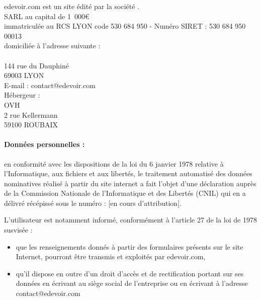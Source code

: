 edevoir.com est un site édité par la société \eDevoir.\\

SARL \eDevoir au capital de 1~000\euro\\
immatriculée au RCS LYON code 530 684 950 - Numéro SIRET : 530 684 950 00013\\

domiciliée à l'adresse suivante :\\
\eDevoir\\
144 rue du Dauphiné\\
69003 LYON\\
E-mail : contact@edevoir.com\\

Hébergeur :\\
OVH\\
2 rue Kellermann\\
59100 ROUBAIX

\paragraph*{Données personnelles :}
en conformité avec les dispositions de la loi du 6 janvier 1978 relative à l'Informatique, aux fichiers et aux libertés, le traitement automatisé des données nominatives réalisé à partir du site internet a fait l'objet d'une déclaration auprès de la Commission Nationale de l'Informatique et des Libertés (CNIL) qui en a délivré récépissé sous le numéro : [en cours d'attribution].

L'utilisateur est notamment informé, conformément à l'article 27 de la loi de 1978 susvisée :
\begin{itemize}
   \item que les renseignements donnés à partir des formulaires présents sur le site Internet, pourront être transmis et exploités par edevoir.com,
   \item qu'il dispose en outre d'un droit d'accès et de rectification portant sur ses données en écrivant au siège social de l'entreprise ou en écrivant à l'adresse contact@edevoir.com
\end{itemize}
